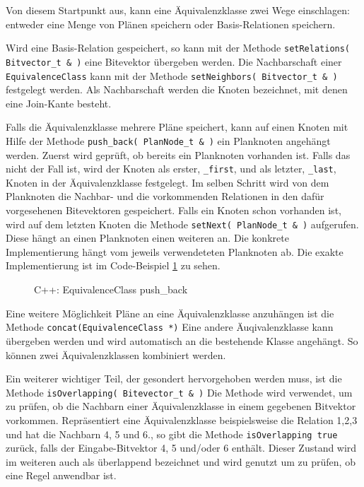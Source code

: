 Von diesem Startpunkt aus, kann eine Äquivalenzklasse zwei Wege einschlagen: entweder eine Menge von Plänen speichern oder Basis-Relationen speichern. 

Wird eine Basis-Relation gespeichert, so kann mit der Methode \texttt{setRelations( Bitvector\_t \& )} eine Bitevektor übergeben werden. Die Nachbarschaft einer \texttt{Equi\-valence\-Class} kann mit der Methode \texttt{set\-Neighbors( Bitvector\_t \& )} festgelegt werden. Als Nachbarschaft werden die Knoten bezeichnet, mit denen eine Join-Kante besteht.




Falls die Äquivalenzklasse mehrere Pläne speichert, kann auf einen Knoten mit Hilfe der Methode \texttt{push\_back( PlanNode\_t \& )} ein Planknoten angehängt werden. Zuerst wird geprüft, ob bereits ein Planknoten vorhanden ist. Falls das nicht der Fall ist, wird der Knoten als erster, \texttt{\_first}, und als letzter, \texttt{\_last}, Knoten in der Äquivalenzklasse festgelegt. Im selben Schritt wird von dem Planknoten die Nachbar- und die vorkommenden Relationen in den dafür vorgesehenen Bitevektoren gespeichert. Falls ein Knoten schon vorhanden ist, wird auf dem letzten Knoten die Methode \texttt{setNext( PlanNode\_t \& )} aufgerufen. Diese hängt an einen Planknoten einen weiteren an. Die konkrete Implementierung hängt vom jeweils verwendeteten Planknoten ab. Die exakte Implementierung ist im Code-Beispiel \ref{listing:Push-Back} zu sehen.


\begin{figure}[ht]

\caption{C++: EquivalenceClass push\_back}
\label{listing:Push-Back}
\end{figure}


Eine weitere Möglichkeit Pläne an eine Äquivalenzklasse anzuhängen ist die Methode \texttt{concat(EquivalenceClass *)} Eine andere Äuqivalenzklasse kann übergeben werden und wird automatisch an die bestehende Klasse angehängt. So können zwei Äquivalenzklassen kombiniert werden.



Ein weiterer wichtiger Teil, der gesondert hervorgehoben werden muss, ist die Methode \texttt{isOverlapping( Bitevector\_t \& )} Die Methode wird  verwendet, um zu prüfen, ob die Nachbarn einer Äquivalenzklasse in einem gegebenen Bitvektor vorkommen. Repräsentiert eine Äquivalenzklasse beispielsweise die Relation 1,2,3 und hat die Nachbarn 4, 5 und 6., so gibt die Methode \texttt{isOverlapping true} zurück, falls der Eingabe-Bitvektor 4, 5 und/oder 6 enthält. Dieser Zustand wird im weiteren auch als überlappend bezeichnet und wird genutzt um zu prüfen, ob eine Regel anwendbar ist.

